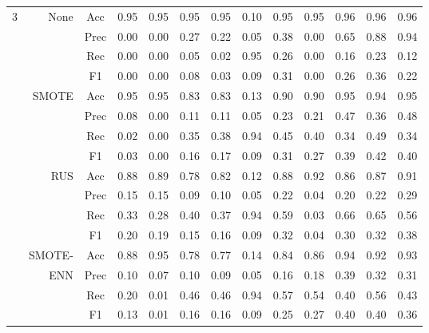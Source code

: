 \begin{table*}
\begin{narrow}{-1cm}{-1cm}
\begin{tabular}{r|r|c|cccccccccc}
3 & None & Acc & 0.95 & 0.95 & 0.95 & 0.95 & 0.10 & 0.95 & 0.95 & 0.96 & 0.96 & 0.96 \\
~ & ~ & Prec & 0.00 & 0.00 & 0.27 & 0.22 & 0.05 & 0.38 & 0.00 & 0.65 & 0.88 & 0.94 \\
~ & ~ & Rec & 0.00 & 0.00 & 0.05 & 0.02 & 0.95 & 0.26 & 0.00 & 0.16 & 0.23 & 0.12 \\
~ & ~ & F1 & 0.00 & 0.00 & 0.08 & 0.03 & 0.09 & 0.31 & 0.00 & 0.26 & 0.36 & 0.22 \\
\cline{2-13}
~ & SMOTE & Acc & 0.95 & 0.95 & 0.83 & 0.83 & 0.13 & 0.90 & 0.90 & 0.95 & 0.94 & 0.95 \\
~ & ~ & Prec & 0.08 & 0.00 & 0.11 & 0.11 & 0.05 & 0.23 & 0.21 & 0.47 & 0.36 & 0.48 \\
~ & ~ & Rec & 0.02 & 0.00 & 0.35 & 0.38 & 0.94 & 0.45 & 0.40 & 0.34 & 0.49 & 0.34 \\
~ & ~ & F1 & 0.03 & 0.00 & 0.16 & 0.17 & 0.09 & 0.31 & 0.27 & 0.39 & 0.42 & 0.40 \\
\cline{2-13}
~ & RUS & Acc & 0.88 & 0.89 & 0.78 & 0.82 & 0.12 & 0.88 & 0.92 & 0.86 & 0.87 & 0.91 \\
~ & ~ & Prec & 0.15 & 0.15 & 0.09 & 0.10 & 0.05 & 0.22 & 0.04 & 0.20 & 0.22 & 0.29 \\
~ & ~ & Rec & 0.33 & 0.28 & 0.40 & 0.37 & 0.94 & 0.59 & 0.03 & 0.66 & 0.65 & 0.56 \\
~ & ~ & F1 & 0.20 & 0.19 & 0.15 & 0.16 & 0.09 & 0.32 & 0.04 & 0.30 & 0.32 & 0.38 \\
\cline{2-13}
~ & SMOTE- & Acc & 0.88 & 0.95 & 0.78 & 0.77 & 0.14 & 0.84 & 0.86 & 0.94 & 0.92 & 0.93 \\
~ & ENN & Prec & 0.10 & 0.07 & 0.10 & 0.09 & 0.05 & 0.16 & 0.18 & 0.39 & 0.32 & 0.31 \\
~ & ~ & Rec & 0.20 & 0.01 & 0.46 & 0.46 & 0.94 & 0.57 & 0.54 & 0.40 & 0.56 & 0.43 \\
~ & ~ & F1 & 0.13 & 0.01 & 0.16 & 0.16 & 0.09 & 0.25 & 0.27 & 0.40 & 0.40 & 0.36 \\
    \hline \hline  
      
      
    \end{tabular}
   

\end{narrow}
\end{table*} 






